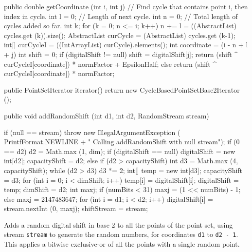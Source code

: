 
\begin{code}
\begin{hide}

   public double getCoordinate (int i, int j) {
      // Find cycle that contains point i, then index in cycle.
      int l = 0;         // Length of next cycle.
      int n = 0;         // Total length of cycles added so far.
      int k;
      for (k = 0;  n <= i;  k++)
         n += l = ((AbstractList) cycles.get (k)).size();
      AbstractList curCycle = (AbstractList) cycles.get (k-1);
      int[] curCycleI = ((IntArrayList) curCycle).elements();
      int coordinate = (i - n + l + j) %
      int shift = 0;
      if (digitalShift != null) {
         shift = digitalShift[j];
         return (shift ^ curCycleI[coordinate]) * normFactor + EpsilonHalf;
      } else
         return (shift ^ curCycleI[coordinate]) * normFactor;
   }

   public PointSetIterator iterator() {
      return new CycleBasedPointSetBase2Iterator ();
   }
\end{hide}

   public void addRandomShift (int d1, int d2, RandomStream stream) \begin{hide} {
      if (null == stream)
         throw new IllegalArgumentException (
              PrintfFormat.NEWLINE +
              "   Calling addRandomShift with null stream");
      if (0 == d2)
         d2 = Math.max (1, dim);
      if (digitalShift == null) {
         digitalShift = new int[d2];
         capacityShift = d2;
      } else if (d2 > capacityShift) {
         int d3 = Math.max (4, capacityShift);
         while (d2 > d3)
            d3 *= 2;
         int[] temp = new int[d3];
         capacityShift = d3;
         for (int i = 0; i < dimShift; i++)
            temp[i] = digitalShift[i];
         digitalShift = temp;
      }
      dimShift = d2;
      int maxj;
      if (numBits < 31) {
         maxj = (1 << numBits) - 1;
      } else {
         maxj = 2147483647;
      }
      for (int i = d1; i < d2; i++)
         digitalShift[i] = stream.nextInt (0, maxj);
      shiftStream = stream;

   }\end{hide}
\end{code}
\begin{tabb}  Adds a random digital shift in base 2 to all the points
  of the point set, using stream \texttt{stream} to generate the random numbers,
  for coordinates \texttt{d1} to \texttt{d2 - 1}.
  This applies a bitwise exclusive-or of all the points with a single
  random point.
\end{tabb}
